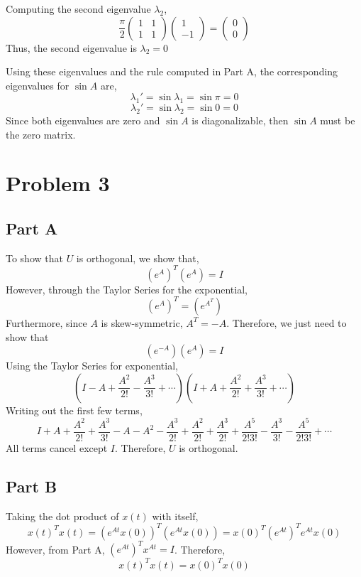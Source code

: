 \documentclass{article}
\begin{document}
Computing the second eigenvalue $\lambda_2$,
$$ \frac{\pi}{2} \begin{pmatrix}
  1 & 1 \\
  1 & 1 
\end{pmatrix} \begin{pmatrix}
  1 \\
  -1
\end{pmatrix} = \begin{pmatrix}
  0 \\
  0
\end{pmatrix} $$
Thus, the second eigenvalue is $\lambda_2 = 0$

Using these eigenvalues and the rule computed in Part A, the corresponding
eigenvalues for $\sin A$ are,
$$ \lambda_1' = \sin \lambda_1 = \sin \pi = 0 $$
$$ \lambda_2' = \sin \lambda_2 = \sin 0 = 0 $$
Since both eigenvalues are zero and $\sin A$ is diagonalizable, then $\sin A$
must be the zero matrix.

\section*{Problem 3}

\subsection*{Part A}

To show that $U$ is orthogonal, we show that,
$$ \left(e^{A}\right)^T \left(e^A\right) = I $$
However, through the Taylor Series for the exponential,
$$ \left(e^A\right)^T = \left(e^{A^T}\right) $$
Furthermore, since $A$ is skew-symmetric, $A^T = -A$. Therefore, we just need
to show that
$$ \left(e^{-A}\right) \left(e^{A}\right) = I $$
Using the Taylor Series for exponential,
$$ \left(I - A + \frac{A^2}{2!} - \frac{A^3}{3!} + \cdots\right) \left(I + A
+ \frac{A^2}{2!} + \frac{A^3}{3!} + \cdots\right) $$
Writing out the first few terms,
$$ I + A + \frac{A^2}{2!} + \frac{A^3}{3!} - A - A^2 - \frac{A^3}{2!} +
\frac{A^2}{2!} + \frac{A^3}{2!} + \frac{A^5}{2!3!} - \frac{A^3}{3!} -
\frac{A^5}{2!3!} + \cdots $$
All terms cancel except $I$. Therefore, $U$ is orthogonal.

\subsection*{Part B}

Taking the dot product of $x(t)$ with itself,
$$ x(t)^T x(t) = \left(e^{At} x(0)\right)^T \left(e^{At} x(0)\right) = x(0)^T
\left(e^{At}\right)^T e^{At} x(0) $$
However, from Part A, $ \left(e^{At}\right)^T x^{At} = I $. Therefore,
$$ x(t)^T x(t) = x(0)^T x(0) $$
\end{document}
